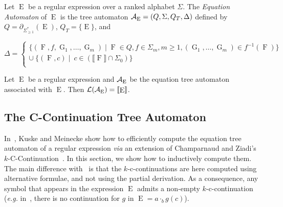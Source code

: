 \documentclass{llncs}
\DeclareMathOperator{\E}{E}
\DeclareMathOperator{\f}{F}
\DeclareMathOperator{\G}{G}
\begin{document}
\begin{definition}\label{def aut eq}
  Let $\E$ be a regular expression over a ranked alphabet $\Sigma$. The  \emph{Equation  Automaton} of $\E$ is the tree automaton ${\cal A_{\E}}=(Q,\Sigma,Q_T,\Delta)$ defined by $Q= \partial_{\Sigma^*_{\geq 1}}(\E)$, $Q_T=\{\E\}$, and
  
  \centerline{$\Delta=
    \left\{
      \begin{array}{c}
        \{(\f,f,\G_1,\dots,\G_m)\mid \f\in Q,f\in\Sigma_m, {m\geq 1},(\G_1,\dots,\G_m)\in f^{-1}(\f)\}\\
        \cup\   \{(\f,c)\mid~ c\in(\llbracket \f\rrbracket\cap\Sigma_0)\}\\
      \end{array}
    \right.$}
\end{definition}

\begin{theorem}
Let $\E$ be a regular expression and ${\cal A_{\E}}$ be the equation tree automaton associated with $\E$. Then
 ${\cal L}({\cal A_{\E}})=\llbracket \E\rrbracket$.
\end{theorem}
\subsection{The C-Continuation Tree Automaton}

In~\cite{automate2}, Kuske and Meinecke show how to efficiently compute the equation tree automaton of a regular expression \emph{via} an extension of Champarnaud and Ziadi's 
$k$-C-Continuation~\cite{ZPC1,ZPC2,khorsi}. In this section, we show how to inductively compute them. The main difference with~\cite{automate2} is that the $k$-c-continuations are here computed using alternative formulae, and not using the partial derivation. As a consequence, any symbol that appears in the expression $\E$ admits a non-empty $k$-c-continuation (\emph{e.g.} in~\cite{automate2}, there is no continuation for $g$ in $\E=a\cdot_b g(c)$). 
\end{document}
